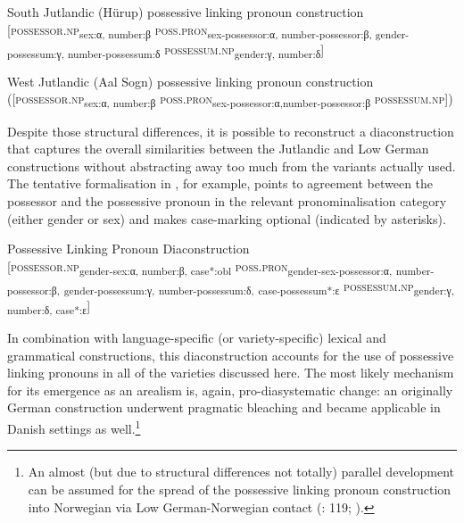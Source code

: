 \documentclass[output=paper]{langsci/langscibook}
\begin{document}
%
 
\ea\label{ex:hoeder:18}
	\ea\label{ex:hoeder:18a}
	South Jutlandic (Hürup) possessive linking pronoun construction\\
     {[}\textsc{possessor.np}\textsubscript{sex:α, number:β} \textsc{poss.pron}\textsubscript{sex-possessor:α, number-possessor:β, gender-possessum:γ, number-possessum:δ} \textsc{possessum.np}\textsubscript{gender:γ, number:δ}{]}

	\ex\label{ex:hoeder:18b}
	 West Jutlandic (Aal Sogn) possessive linking pronoun construction\\
     ({[}\textsc{possessor.np}\textsubscript{sex:α, number:β} \textsc{poss.pron}\textsubscript{sex-possessor:α,}\textsubscript{number-possessor:β} \textsc{possessum.np}{]})
     \z
     \z
     
Despite those structural differences, it is possible to reconstruct a diaconstruction that captures the overall similarities between the Jutlandic and Low German constructions without abstracting away too much from the variants actually used. The tentative formalisation in , for example, points to agreement between the possessor and the possessive pronoun in the relevant pronominalisation category (either gender or sex) and makes case-marking optional (indicated by asterisks).

\ea\label{ex:hoeder:19}
	Possessive Linking Pronoun Diaconstruction\\
     {[}\textsc{possessor.np}\textsubscript{gender-sex:α, number:β, case*:obl} \textsc{poss.pron}\textsubscript{gender-sex-possessor:α,} \textsubscript{number-possessor:β,} \textsubscript{gender-possessum:γ,} \textsubscript{number-possessum:δ,} \textsubscript{case-possessum*:ε} \textsc{possessum.np}\textsubscript{gender:γ, number:δ, case*:ε}{]}
 \z
 
 
In combination with language-specific (or variety-specific) lexical and grammatical constructions, this diaconstruction accounts for the use of possessive linking pronouns in all of the varieties discussed here. The most likely mechanism for its emergence as an arealism is, again, pro-diasystematic change: an originally German construction underwent pragmatic bleaching and became applicable in Danish settings as well.\footnote{An almost (but due to structural differences not totally) parallel development can be assumed for the spread of the possessive linking pronoun construction into Norwegian via Low German-Norwegian contact (\citealt{Hoder.2016a}: 119; \citealt{Nesse.1998}).}
\end{document}
